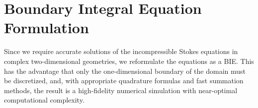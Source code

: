 \documentclass{jfm}
\begin{document}
\section{Boundary Integral Equation Formulation}
\label{sec:DLP}
Since we require accurate solutions of the incompressible Stokes
equations in complex two-dimensional geometries, we reformulate the
equations as a BIE.  This has the advantage that only the
one-dimensional boundary of the domain must be discretized, and, with
appropriate quadrature formulas and fast summation methods, the result
is a high-fidelity numerical simulation with near-optimal computational
complexity.

\end{document}
